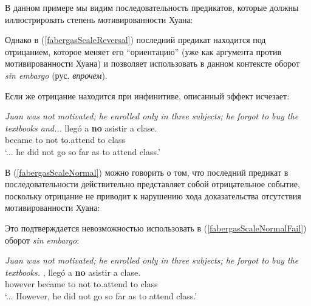 \documentclass[a4paper, titlepage]{article}
\begin{document}
В данном примере мы видим последовательность предикатов, которые должны иллюстрировать степень мотивированности Хуана:

\begin{exe}
\end{exe}

Однако в (\ref{fabergasScaleReversal}) последний предикат находится под отрицанием, которое меняет его ``ориентацию'' (уже как аргумента против мотивированности Хуана) и позволяет использовать в данном контексте оборот \textit{sin embargo} (рус. \textit{впрочем}). 

\medskip

Если же отрицание находится при инфинитиве, описанный эффект исчезает:

\begin{exe}
    \ex \label{fabergasScaleNormal} {\small \textit{Juan was not motivated; he enrolled only in three subjects; he forgot to buy the textbooks and...}}
        \gll llegó a \textbf{no} asistir a clase. \\
             became to not to.attend to class \\
        \glt `... he did not go so far as to attend class.'
\end{exe}

В (\ref{fabergasScaleNormal}) можно говорить о том, что последний предикат в последовательности действительно представляет собой отрицательное событие, поскольку отрицание не приводит к нарушению хода доказательства отсутствия мотивированности Хуана:

\begin{exe}
\end{exe}

Это подтверждается невозможностью использовать в (\ref{fabergasScaleNormalFail}) оборот \textit{sin embargo}:

\begin{exe}
    \ex \label{fabergasScaleNormalFail} {\small \textit{Juan was not motivated; he enrolled only in three subjects; he forgot to buy the textbooks.}}
        , llegó a \textbf{no} asistir a clase. \\
             however became to not to.attend to class \\
        \glt `... However, he did not go so far as to attend class.'
\end{exe}
\end{document}
